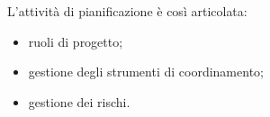  L'attività di pianificazione è così articolata:
\begin{itemize}
	\item{ruoli di progetto;}
	\item{gestione degli strumenti di coordinamento;}
	\item{gestione dei rischi.}
\end{itemize}